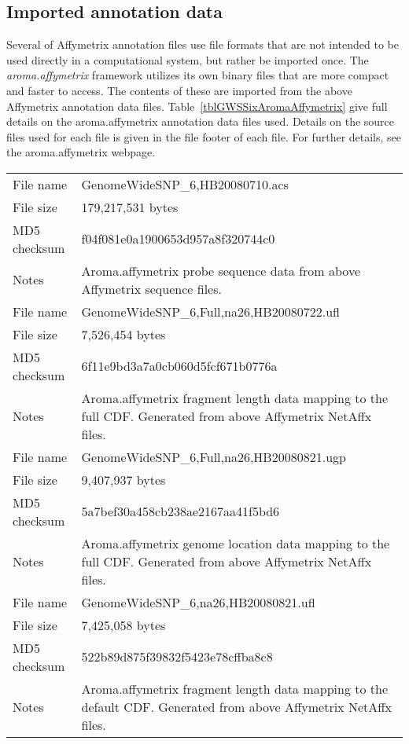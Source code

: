 \documentclass[10pt,a4paper]{article}
\newcommand{\pkg}[1]{\textit{#1}\xspace}
\begin{document}
\subsection{Imported annotation data}
Several of Affymetrix annotation files use file formats that are not intended to be used directly in a computational system, but rather be imported once.  The \pkg{aroma.affymetrix} framework utilizes its own binary files that are more compact and faster to access.  The contents of these are imported from the above Affymetrix annotation data files.  Table~\ref{tblGWSSixAromaAffymetrix} give full details on the aroma.affymetrix annotation data files used.  Details on the source files used for each file is given in the file footer of each file.  For further details, see the aroma.affymetrix webpage.

\begin{table}[htp]
\begin{center}
\begin{tabular}{lp{}}
\hline
File name    & GenomeWideSNP\_6,HB20080710.acs \\
File size    & 179,217,531 bytes \\
MD5 checksum & f04f081e0a1900653d957a8f320744c0 \\
Notes        & Aroma.affymetrix probe sequence data from above Affymetrix sequence files. \\
\hline
File name    & GenomeWideSNP\_6,Full,na26,HB20080722.ufl \\
File size    & 7,526,454 bytes \\
MD5 checksum & 6f11e9bd3a7a0cb060d5fcf671b0776a \\
Notes        & Aroma.affymetrix fragment length data mapping to the full CDF.  Generated from above Affymetrix NetAffx files. \\
\hline
File name    & GenomeWideSNP\_6,Full,na26,HB20080821.ugp \\
File size    & 9,407,937 bytes \\
MD5 checksum & 5a7bef30a458cb238ae2167aa41f5bd6 \\
Notes        & Aroma.affymetrix genome location data mapping to the full CDF.  Generated from above Affymetrix NetAffx files. \\
\hline
File name    & GenomeWideSNP\_6,na26,HB20080821.ufl \\
File size    & 7,425,058 bytes \\
MD5 checksum & 522b89d875f39832f5423e78cffba8c8 \\
Notes        & Aroma.affymetrix fragment length data mapping to the default CDF.  Generated from above Affymetrix NetAffx files. \\

\end{tabular}
\end{center}
\end{table}
\end{document}
